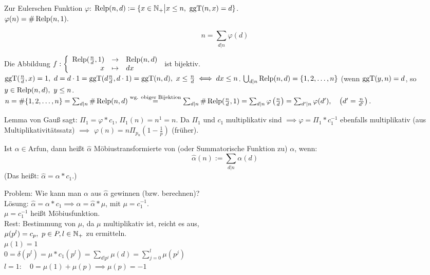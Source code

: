 \documentclass[a4paper,twoside,DIV15,BCOR12mm]{scrbook}
\begin{document}
Zur Eulerschen Funktion $\varphi$:
$\mathop{\rm Relp}\nolimits(n,d):=\{x\in\mathbb{N}_+\big|x\leq
n,\ \mathop{\rm ggT}\nolimits(n,x)=d\}$.\\
$\varphi(n)=\#\mathop{\rm Relp}\nolimits(n,1).$
\begin{lemma}[Gauß]
    $$n=\sum_{d|n}\varphi(d)$$
\end{lemma}
\begin{beweis}
    Die Abbildung $f:\left\{\begin{array}{rcl}\mathop{\rm Relp}\nolimits(\frac nd,1)
    &\to& \mathop{\rm Relp}\nolimits(n,d)\\ x &\mapsto& dx\end{array} \right.$ ist
    bijektiv.\\
    $\mathop{\rm ggT}\nolimits(\frac nd,x)=1,\ d=d\cdot 1=\mathop{\rm ggT}\nolimits(d \frac n d, d\cdot
    1)=\mathop{\rm ggT}\nolimits(n,d),\ x\leq \frac nd \iff dx\leq n$. $\bigcup_{d|n}
    \mathop{\rm Relp}\nolimits(n,d)=\{1,2,\dotsc,n\}$ (wenn $\mathop{\rm ggT}\nolimits(y,n)=d$, so $y \in
    \mathop{\rm Relp}\nolimits(n,d),\ y\leq n$.\\
    $n=\#\{1,2,\dotsc,n\}=\sum_{d|n}\# \mathop{\rm Relp}\nolimits(n,d)\stackrel{\text{wg. obiger Bijektion}}{=}\sum_{d|n}
    \#\mathop{\rm Relp}\nolimits(\frac nd,1)=\sum_{d|n}\varphi\left( \frac{n}{d}
    \right)=\sum_{d'|n}\varphi(d'),\quad \left(d'=\frac
    {n}{d'}\right).$
\end{beweis}
Lemma von Gauß sagt: $\Pi_1=\varphi * c_1$, $\Pi_1(n)=n^1=n$. Da
$\Pi_1$ und $c_1$ multiplikativ sind $\implies \varphi=\Pi_1 *
c_1^{-1}$ ebenfalls multiplikativ (aus Multiplikativitätssatz)
$\implies$ $\varphi(n)=n \Pi_{p_n}(1-\frac 1 p)$ (früher).
\begin{definition}
    Ist $\alpha \in \text{Arfun}$, dann heißt $\hat{\alpha}$
    Möbiustransformierte von (oder Summatorische Funktion zu)
    $\alpha$, wenn:
    $$
        \hat{\alpha}(n):=\sum_{d|n}\alpha(d)
    $$
    (Das heißt: $\hat{\alpha}=\alpha * c_1$.)
\end{definition}
Problem: Wie kann man $\alpha$ aus $\hat{\alpha}$ gewinnen (bzw. berechnen)?\\
Lösung: $\hat{\alpha}=\alpha * c_1 \implies \alpha=\hat{\alpha} * \mu$, mit $\mu=c_1^{-1}$.\\
$\mu=c_1^{-1}$ heißt Möbiusfunktion.\\
Rest: Bestimmung von $\mu$, da $\mu$ multiplikativ ist, reicht es aus,\\
$\mu(p^l)=c_p,\ p\in P, l \in \mathbb{N}_+$ zu ermitteln.\\
$\mu(1)=1$\\
$0=\delta(p^l)=\mu*c_1(p^l)=\sum_{d|p^l}\mu(d)=\sum_{j=0}^l\mu(p^j)$\\
$l=1:\quad 0=\mu(1)+\mu(p)\implies \mu(p)=-1$\\
\end{document}
